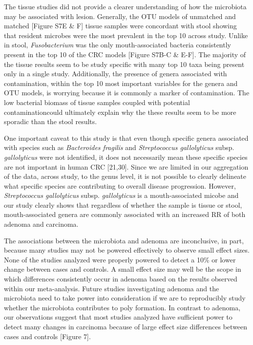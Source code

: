 \documentclass[12pt,]{article}
\begin{document}
The tissue studies did not provide a clearer understanding of how the
microbiota may be associated with lesion. Generally, the OTU models of
unmatched and matched {[}Figure S7E \& F{]} tissue samples were
concordant with stool showing that resident microbes were the most
prevalent in the top 10 across study. Unlike in stool,
\emph{Fusobacterium} was the only mouth-associated bacteria consistently
present in the top 10 of the CRC models {[}Figure S7B-C \& E-F{]}. The
majority of the tissue results seem to be study specific with many top
10 taxa being present only in a single study. Additionally, the presence
of genera associated with contamination, within the top 10 most
important variables for the genera and OTU models, is worrying because
it is commonly a marker of contamination. The low bacterial biomass of
tissue samples coupled with potential contaminationcould ultimately
explain why the these results seem to be more sporadic than the stool
results.

One important caveat to this study is that even though specific genera
associated with species such as \emph{Bacteroides fragilis} and
\emph{Streptococcus gallolyticus} subsp. \emph{gallolyticus} were not
identified, it does not necessarily mean these specific species are not
important in human CRC {[}21,30{]}. Since we are limited in our
aggregation of the data, across study, to the genus level, it is not
possible to clearly delineate what specific species are contributing to
overall disease progression. However, \emph{Streptococcus gallolyticus}
subsp. \emph{gallolyticus} is a mouth-associated micobe and our study
clearly shows that regardless of whether the sample is tissue or stool,
mouth-associated genera are commonly associated with an increased RR of
both adenoma and carcinoma.

The associations between the microbiota and adenoma are inconclusive, in
part, because many studies may not be powered effectively to observe
small effect sizes. None of the studies analyzed were properly powered
to detect a 10\% or lower change between cases and controls. A small
effect size may well be the scope in which differences consistently
occur in adenoma based on the results observed within our meta-analysis.
Future studies investigating adenoma and the microbiota need to take
power into consideration if we are to reproducibly study whether the
microbiota contributes to poly formation. In contrast to adenoma, our
observations suggest that most studies analyzed have sufficient power to
detect many changes in carcinoma because of large effect size
differences between cases and controls {[}Figure 7{]}.
\end{document}

